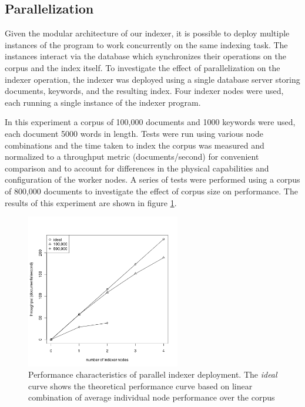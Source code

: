 \documentclass[10pt]{article}
\begin{document}
\subsection{Parallelization}
\label{parallelization}
Given the modular architecture of our indexer, it is possible to
deploy multiple instances of the program to work concurrently on the same
indexing task. The instances interact via the database which
synchronizes their operations on the corpus and the index itself. To
investigate the effect of parallelization on the indexer operation, the
indexer was deployed using a single database server storing documents,
keywords, and the resulting index. Four indexer nodes were used, each
running a single instance of the indexer program. 

In this experiment a corpus of 100,000 documents and 1000 keywords were
used, each document 5000 words in length. Tests were run using various
node combinations and the time taken to index the corpus was measured and
normalized to a throughput metric (documents/second) for convenient
comparison and to account for differences in the physical capabilities
and configuration of the worker nodes. A series of tests were
performed using a corpus of 800,000 documents to investigate the
effect of corpus size on performance. The results of this experiment
are shown in figure \ref{fig:parallelization}.


\begin{figure}
  \begin{center}
        \includegraphics[width=0.60\textwidth,height=!]{parallelization}
  \end{center}
  \caption{Performance characteristics of parallel indexer
    deployment. The \textit{ideal} curve shows the theoretical
    performance curve based on linear combination of average
    individual node performance over the corpus} 
  \label{fig:parallelization}
\end{figure} 
\end{document}
